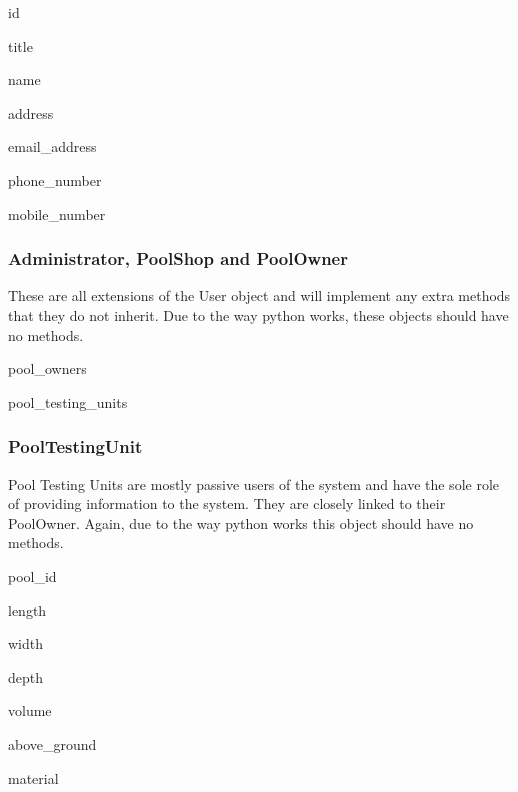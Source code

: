 {
	\item id
	\item title
	\item name
	\item address 
	\item email\_address
	\item phone\_number
	\item mobile\_number
}
{
	\item
}

\subsubsection{Administrator, PoolShop and PoolOwner}
These are all extensions of the User object and will implement any extra methods that they do not inherit. Due to the way python works, these objects should have no methods.

{
	\item 
}
{
	\item
}

{
	\item pool\_owners
}
{
	\item 
}

{
	\item pool\_testing\_units
}
{
	\item
}

\subsubsection{PoolTestingUnit}
Pool Testing Units are mostly passive users of the system and have the sole role of providing information to the system. They are closely linked to their PoolOwner. Again, due to the way python works this object should have no methods.

{
	\item pool\_id
	\item length
	\item width
	\item depth
	\item volume
	\item above\_ground
	\item material
						
}
{
	\item
}